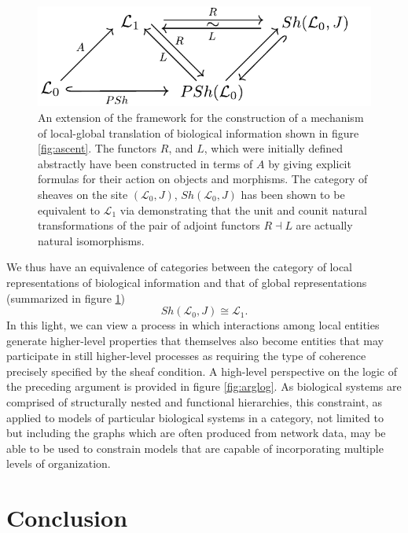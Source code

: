 \documentclass[aps,twocolumn]{revtex4-1}
\begin{document}
\begin{figure}
\noindent\includegraphics[width=0.9\columnwidth]{fig/equivalence.pdf}
\caption{An extension of the framework for the construction of a mechanism of local-global translation of biological information shown in figure \ref{fig:ascent}.  The functors $R$, and $L$, which were initially defined abstractly have been constructed in terms of $A$ by giving explicit formulas for their action on objects and morphisms. The category of sheaves on the site $(\mathcal{L}_0,J)$, $Sh(\mathcal{L}_0,J)$  has been shown to be equivalent to $\mathcal{L}_1$ via demonstrating that the unit and counit natural transformations of the pair of adjoint functors $R
\dashv L$ are actually natural isomorphisms.}
\label{fig:equivalence}
\end{figure}

We thus have an equivalence of categories between the category of local representations of biological information and that of global representations (summarized in figure \ref{fig:equivalence})
$$
Sh(\mathcal{L}_0,J) \cong \mathcal{L}_1.
$$
In this light, we can view a process in which interactions among local entities generate higher-level properties that themselves also become entities that may participate in still higher-level processes as requiring the type of coherence precisely specified by the sheaf condition. A high-level perspective on the logic of the preceding argument is provided in figure \ref{fig:arglog}. As biological systems are comprised of structurally nested and functional hierarchies, this constraint, as applied to models of particular biological systems in a category, not limited to but including the graphs which are often produced from network data, may be able to be used to constrain models that are capable of incorporating multiple levels of organization.

\section{Conclusion}
\end{document}
